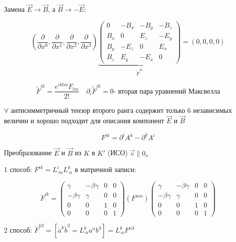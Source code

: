 \documentclass[12pt, a4paper]{report}
\begin{document}
Замена \( \vec{E }  \to  \vec{ B }   \), а \( \vec{ B } \to  -\vec{ E }:  \) 

\[ \left( \frac{\partial  }{ \partial  x ^0 }, \frac{\partial}{ \partial  x ^1 } , \frac{\partial  }{\partial  x^2 } , \frac{\partial  }{\partial  x^3 }     \right)  
\underbrace{\begin{pmatrix}
    0  & - B_x  & - B_y  & -B_z\\
    B_x  & 0  & E_z  & -E_y \\
    B_y  & -E_z  & 0  &  E_x \\
    B_z  & E_y  & -E_x  & 0
\end{pmatrix}}_{\tilde{F }^{ik} }  = (0,0,0,0)\] 

\[ \tilde{ F } ^{ik }  = \frac{e^{ik lm } F_{lm } }{2!}  \quad  \boxed{\partial_i \tilde{ F }^{ ik }  = 0} \text{- вторая пара уравнений Максвелла}  \] 

\( \forall   \) антисимметричный тензор второго ранга содержит только 6 независимых величин и хорошо подходит для описания компонент \( \vec{E}  \) и \( \vec{B}  \) 

\[ F^{ik }  = \partial ^i A^k - \partial ^k A^i  \] 

Преобразование \( \vec{ E }  \) и \( \vec{B}  \) из \( K  \) в \( K'  \) (ИСО) \( \vec{ v }  \parallel 0_x \) 

1 способ: \( F^{ik }  = L^i _{\cdot m }  L^k _{\cdot n }   \) в матричной записи: 

\[ \acute{F}^{ik }  =\displaystyle  \begin{pmatrix}
    \gamma  & - \beta   \gamma & 0 & 0\\
    - \beta \gamma  & \gamma &0 & 0\\
    0 & 0 & 1 & 0\\
    0 & 0 & 0 & 1
    \end{pmatrix} \left( F^{mn }  \right) \begin{pmatrix}
        \gamma  & - \beta   \gamma & 0 & 0\\
        - \beta \gamma  & \gamma &0 & 0\\
        0 & 0 & 1 & 0\\
        0 & 0 & 0 & 1
        \end{pmatrix} \] 

2 способ: \( \acute{F}^{k 3 }  = \left[ \acute{a } ^k \acute{b }^3 = L_{\cdot n}^ k a^n b^3    \right] = L_{\cdot n } ^k F^{ n 3 }   \) 
\end{document}
